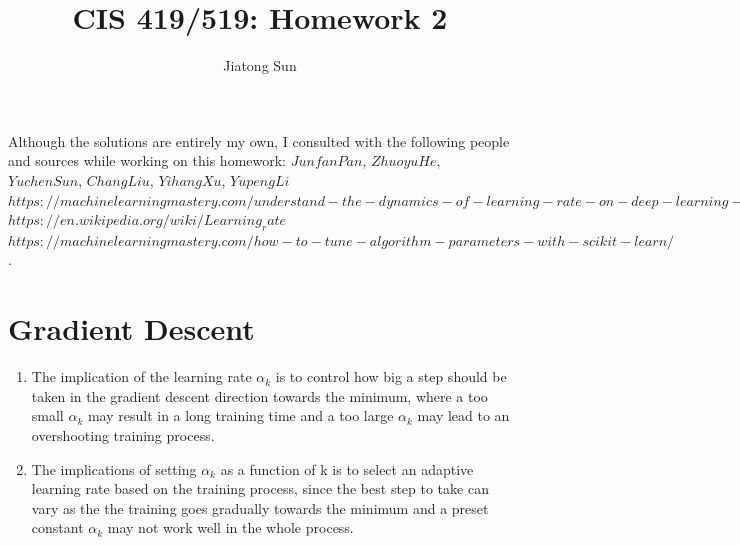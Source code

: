 \documentclass{article}
\title{CIS 419/519: Homework 2}
\author{Jiatong Sun}
\date{}
\begin{document}
    \maketitle
	Although the solutions are entirely my own, I consulted with the following people and sources while working on this homework: $Junfan Pan$, $Zhuoyu He$, $Yuchen Sun$, $Chang Liu$, $Yihang Xu$, $Yupeng Li$ \\
    $https://machinelearningmastery.com/understand-the-dynamics-of-learning-rate-on-deep-learning-neural-networks/$\\
    $https://en.wikipedia.org/wiki/Learning_rate$\\
    $https://machinelearningmastery.com/how-to-tune-algorithm-parameters-with-scikit-learn/$.
    
    \section{Gradient Descent}
        \begin{enumerate}[label=\alph*.]
            \item %
            The implication of the learning rate $\alpha_{k}$ is to control how big a step should be taken in the gradient descent direction towards the minimum, where a too small $\alpha_{k}$ may result in a long training time and a too large $\alpha_{k}$ may lead to an overshooting training process.
            
            
            \item %
            The implications of setting $\alpha_{k}$ as a function of k is to select an adaptive learning rate based on the training process, since the best step to take can vary as the the training goes gradually towards the minimum and a preset constant $\alpha_{k}$ may not work well in the whole process.
        \end{enumerate}
        
\end{document}
